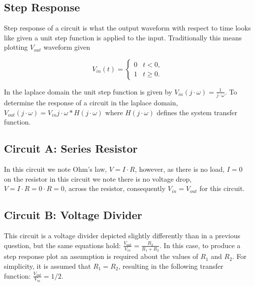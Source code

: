 \documentclass[main.tex]{subfiles}
\begin{document}
\subsection{Step Response}
Step response of a circuit is what the output waveform with respect to time looks like given a unit step function is applied to the input. Traditionally this means plotting $V_{out}$ waveform given 

\[
    V_{in}(t) =
    \begin{cases} 
        0 & t < 0, \\
        1 & t \geq 0.
    \end{cases}
\]

In the laplace domain the unit step function is given by $V_{in}(j \cdot \omega) = \frac{1}{j \cdot \omega}$. To determine the response of a circuit in the laplace domain, $V_{out}(j \cdot \omega) = V_{in}{j \cdot \omega} * H(j \cdot \omega)$ where $H(j \cdot \omega)$ defines the system transfer function. 

\subsection{Circuit A: Series Resistor}
In this circuit we note Ohm's law, $V = I \cdot R$, however, as there is no load, $I=0$ on the resistor in this circuit we note there is no voltage drop, $V=I \cdot R=0 \cdot R=0$, across the resistor, consequently $V_{in} = V_{out}$ for this circuit. 


\subsection{Circuit B: Voltage Divider}
This circuit is a voltage divider depicted slightly differently than in a previous question, but the same equations hold: $\frac{V_{out}}{V_{in}} = \frac{R_2}{R_1 + R_2}$. In this case, to produce a step response plot an assumption is required about the values of $R_1$ and $R_2$. For simplicity, it is assumed that $R_1 = R_2$, resulting in the following transfer function: $\frac{V_{out}}{V_{in}} = 1/2$.

\end{document}
